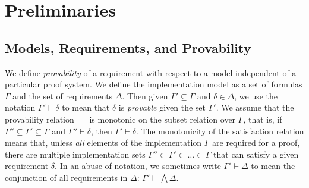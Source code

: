
\section{Preliminaries}
\label{sec:background}
\newcommand{\satisfies}{\vdash_{\!\!s}}
\newcommand{\nsatisfies}{\nvdash_{\!\!s}}
\newcommand{\bool}[0]{\mathit{bool}}
\newcommand{\reach}[0]{\mathit{R}}
\newcommand{\ite}[3]{\mathit{if}\ {#1}\ \mathit{then}\ {#2}\ \mathit{else}\ {#3}}

\subsection{Models, Requirements, and Provability}

We define \emph{provability} of a requirement with respect to a model independent of a particular proof system.  We define the implementation model as a set of formulas $\Gamma$  and the set of requirements $\Delta$.  
Then given $\Gamma' \subseteq \Gamma$ and $\delta \in \Delta$, we use the notation $\Gamma' \vdash \delta$ to mean that $\delta$ is \emph{provable} given the set $\Gamma'$.  We assume that the provability relation $\vdash$ is monotonic on the subset relation over $\Gamma$, that is, if $\Gamma'' \subseteq \Gamma' \subseteq \Gamma$ and $\Gamma'' \vdash \delta$, then $\Gamma' \vdash \delta$.  The monotonicity of the satisfaction relation means that, unless {\em all} elements of the implementation $\Gamma$ are required for a proof, there are multiple implementation sets $\Gamma'' \subset \Gamma' \subset \ldots \subset \Gamma$ that can satisfy a given requirement $\delta$.  In an abuse of notation, we sometimes write $\Gamma' \vdash \Delta$ to mean the conjunction of all requirements in $\Delta$: $\Gamma' \vdash \bigwedge \Delta$.

